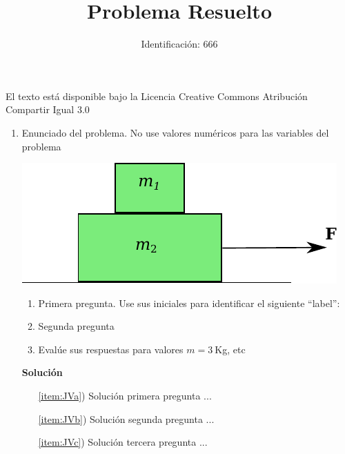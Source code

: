 \documentclass[12pt]{article}
\title{Problema Resuelto}
\author{Identificación: 666}
\begin{document}
\maketitle


El texto está disponible bajo la Licencia Creative Commons Atribución Compartir Igual 3.0
\begin{enumerate} 

\item Enunciado del problema. No use valores numéricos para las variables del problema

  \begin{minipage}{0.4\linewidth}
    \includegraphics[scale=0.95]{bloques}
  \end{minipage}
  \begin{minipage}{0.6\linewidth}
    \begin{enumerate}
    \item Primera pregunta. Use sus iniciales para identificar el  siguiente ``label'':
      \label{item:JVa}
    \item Segunda pregunta
      \label{item:JVb}
    \item Evalúe sus respuestas para valores $m=3\ $Kg, etc
      \label{item:JVc}
    \end{enumerate}
  \end{minipage}
  
  \textbf{Solución}
  \begin{itemize}
  \item[\ref{item:JVa})] Solución primera pregunta ...
  \item[\ref{item:JVb})] Solución segunda pregunta ...
  \item[\ref{item:JVc})] Solución tercera pregunta ...
  \end{itemize}

\end{enumerate}
\end{document}
